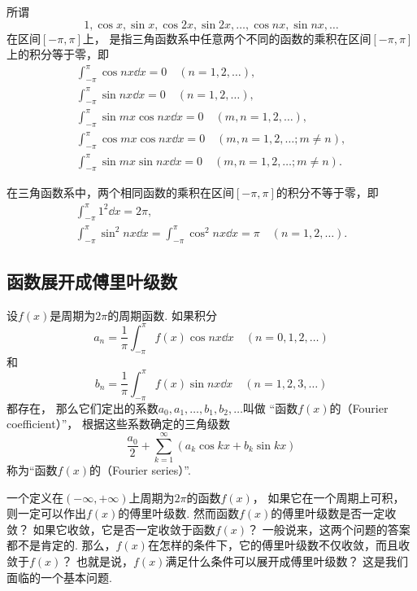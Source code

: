 \begin{definition}
所谓\[
1, \cos x, \sin x, \cos 2x, \sin 2x, \dotsc, \cos nx, \sin nx, \dotsc
\]在区间\([-\pi,\pi]\)上，
是指三角函数系中任意两个不同的函数的乘积在区间\([-\pi,\pi]\)上的积分等于零，即
\begin{gather*}
\int_{-\pi}^{\pi} \cos{nx} \dd{x} = 0 \quad(n=1,2,\dotsc), \\
\int_{-\pi}^{\pi} \sin{nx} \dd{x} = 0 \quad(n=1,2,\dotsc), \\
\int_{-\pi}^{\pi} \sin{mx}\cos{nx} \dd{x} = 0 \quad(m,n=1,2,\dotsc), \\
\int_{-\pi}^{\pi} \cos{mx}\cos{nx} \dd{x} = 0 \quad(m,n=1,2,\dotsc; m \neq n), \\
\int_{-\pi}^{\pi} \sin{mx}\sin{nx} \dd{x} = 0 \quad(m,n=1,2,\dotsc; m \neq n).
\end{gather*}

在三角函数系中，两个相同函数的乘积在区间\([-\pi,\pi]\)的积分不等于零，即
\begin{gather*}
\int_{-\pi}^{\pi} 1^2 \dd{x} = 2\pi, \\
\int_{-\pi}^{\pi} \sin^2 nx \dd{x} = \int_{-\pi}^{\pi} \cos^2 nx \dd{x} = \pi \quad(n=1,2,\dotsc).
\end{gather*}
\end{definition}

\subsection{函数展开成傅里叶级数}
\begin{definition}\label{definition:无穷级数.傅里叶级数}
设\(f(x)\)是周期为\(2 \pi\)的周期函数.
如果积分\[
a_n = \frac{1}{\pi} \int_{-\pi}^{\pi} f(x) \cos nx \dd{x} \quad(n=0,1,2,\dotsc)
\]和\[
b_n = \frac{1}{\pi} \int_{-\pi}^{\pi} f(x) \sin nx \dd{x} \quad(n=1,2,3,\dotsc)
\]都存在，
那么它们定出的系数\(a_0,a_1,\dotsc,b_1,b_2,\dotsc\)叫做%
“函数\(f(x)\)的（Fourier coefficient）”，
根据这些系数确定的三角级数\[
\frac{a_0}{2} + \sum\limits_{k=1}^\infty (a_k \cos{kx} + b_k \sin kx)
\]称为“函数\(f(x)\)的（Fourier series）”.
\end{definition}

一个定义在\((-\infty,+\infty)\)上周期为\(2\pi\)的函数\(f(x)\)，
如果它在一个周期上可积，
则一定可以作出\(f(x)\)的傅里叶级数.
然而函数\(f(x)\)的傅里叶级数是否一定收敛？
如果它收敛，它是否一定收敛于函数\(f(x)\)？
一般说来，这两个问题的答案都不是肯定的.
那么，\(f(x)\)在怎样的条件下，它的傅里叶级数不仅收敛，而且收敛于\(f(x)\)？
也就是说，\(f(x)\)满足什么条件可以展开成傅里叶级数？
这是我们面临的一个基本问题.

